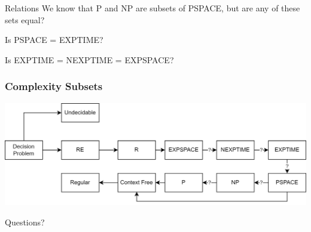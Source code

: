 \documentclass[aspectratio=169, handout]{beamer}
\begin{document}
\begin{frame}{Relations}
    We know that \textsc{P} and \textsc{NP} are subsets of \textsc{PSPACE}, but are any of these sets equal? \pause
    
    Is \textsc{PSPACE} = \textsc{EXPTIME}? \pause

    Is \textsc{EXPTIME} = \textsc{NEXPTIME} = \textsc{EXPSPACE}?
\end{frame}

\begin{frame}
  \frametitle{Complexity Subsets}
  \begin{center}
    \includegraphics[width=\textwidth]{complexity.png}
  \end{center}
\end{frame}

\begin{frame}{}
    \begin{center}
        {\color{sigma@mainblue} \LARGE Questions?}
    \end{center}
\end{frame}
\end{document}
